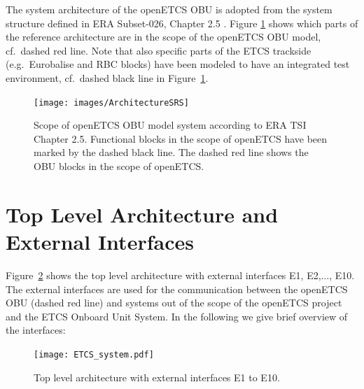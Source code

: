 
The system architecture of the openETCS OBU is adopted from the system structure defined in ERA Subset-026, Chapter 2.5 \cite{subset-026}. Figure \ref{f:architecture_srs} shows which parts of the reference architecture are in the scope of the openETCS OBU model, cf.~dashed red line. Note that also specific parts of the ETCS trackside (e.g.~Eurobalise and RBC blocks) have been modeled to have an integrated test environment, cf.~dashed black line in Figure~\ref{f:architecture_srs}.

\begin{figure}[H]
\centering
\texttt{[image: images/ArchitectureSRS]}
\caption[Scope of openETCS OBU model system according to ERA TSI Chapter 2.5.]{Scope of openETCS OBU model system according to ERA TSI Chapter 2.5. Functional blocks in the scope of openETCS have been marked by the dashed black line. The dashed red line shows the OBU blocks in the scope of openETCS.}
\label{f:architecture_srs}
\end{figure}


\section{Top Level Architecture and External Interfaces}

Figure~\ref{f:top_level} shows the top level architecture with external interfaces E1, E2,$\ldots$, E10. The external interfaces are used for the communication between the openETCS OBU (dashed red line) and systems out of the scope of the openETCS project and the ETCS Onboard Unit System. In the following we give  brief overview of the interfaces:
\begin{figure}
\centering
\texttt{[image: ETCS\_system.pdf]}
\caption{Top level architecture with external interfaces E1 to E10.}
\label{f:top_level}
\end{figure}

